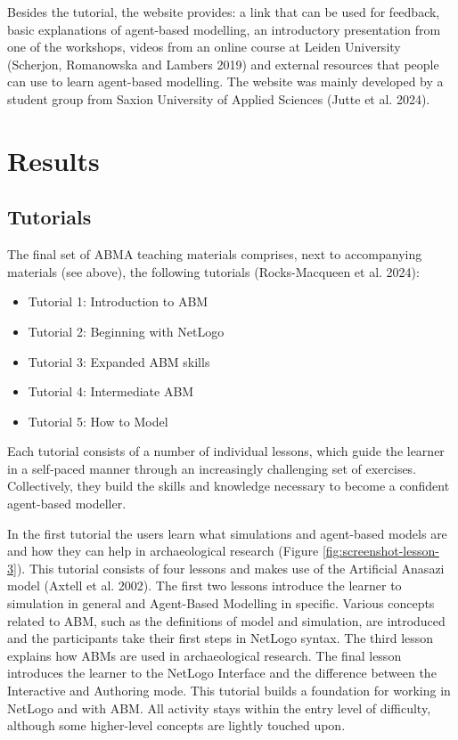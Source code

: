 \documentclass[
]{article}
\begin{document}
Besides the tutorial, the website provides: a link that can be used for feedback, basic explanations of agent-based modelling, an introductory presentation from one of the workshops, videos from an online course at Leiden University (Scherjon, Romanowska and Lambers 2019) and external resources that people can use to learn agent-based modelling. The website was mainly developed by a student group from Saxion University of Applied Sciences (Jutte et al. 2024).

\hypertarget{results}{%
\section{Results}\label{results}}

\hypertarget{tutorials}{%
\subsection{Tutorials}\label{tutorials}}

The final set of ABMA teaching materials comprises, next to accompanying materials (see above), the following tutorials (Rocks-Macqueen et al. 2024):

\begin{itemize}
\item
  Tutorial 1: Introduction to ABM
\item
  Tutorial 2: Beginning with NetLogo
\item
  Tutorial 3: Expanded ABM skills
\item
  Tutorial 4: Intermediate ABM
\item
  Tutorial 5: How to Model
\end{itemize}

Each tutorial consists of a number of individual lessons, which guide the learner in a self-paced manner through an increasingly challenging set of exercises. Collectively, they build the skills and knowledge necessary to become a confident agent-based modeller.

In the first tutorial the users learn what simulations and agent-based models are and how they can help in archaeological research (Figure \ref{fig:screenshot-lesson-3}). This tutorial consists of four lessons and makes use of the Artificial Anasazi model (Axtell et al. 2002). The first two lessons introduce the learner to simulation in general and Agent-Based Modelling in specific. Various concepts related to ABM, such as the definitions of model and simulation, are introduced and the participants take their first steps in NetLogo syntax. The third lesson explains how ABMs are used in archaeological research. The final lesson introduces the learner to the NetLogo Interface and the difference between the Interactive and Authoring mode. This tutorial builds a foundation for working in NetLogo and with ABM. All activity stays within the entry level of difficulty, although some higher-level concepts are lightly touched upon.
\end{document}
